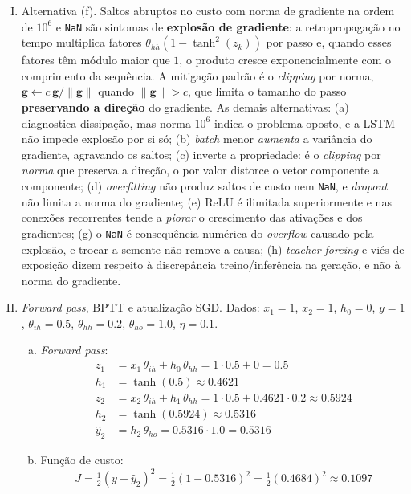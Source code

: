 \documentclass{dlproblemset}
\begin{document}
\begin{enumerate}[I)]
    \item Alternativa (f). Saltos abruptos no custo com norma de gradiente na ordem de $10^{6}$ e \texttt{NaN} são sintomas de \textbf{explosão de gradiente}: a retropropagação no tempo multiplica fatores $\theta_{hh}(1-\tanh^2(z_k))$ por passo e, quando esses fatores têm módulo maior que $1$, o produto cresce exponencialmente com o comprimento da sequência. A mitigação padrão é o \textit{clipping} por norma, $\mathbf{g} \leftarrow c\,\mathbf{g}/\|\mathbf{g}\|$ quando $\|\mathbf{g}\| > c$, que limita o tamanho do passo \textbf{preservando a direção} do gradiente. As demais alternativas: (a) diagnostica dissipação, mas norma $10^{6}$ indica o problema oposto, e a LSTM não impede explosão por si só; (b) \textit{batch} menor \emph{aumenta} a variância do gradiente, agravando os saltos; (c) inverte a propriedade: é o \textit{clipping} por \emph{norma} que preserva a direção, o por valor distorce o vetor componente a componente; (d) \textit{overfitting} não produz saltos de custo nem \texttt{NaN}, e \textit{dropout} não limita a norma do gradiente; (e) ReLU é ilimitada superiormente e nas conexões recorrentes tende a \emph{piorar} o crescimento das ativações e dos gradientes; (g) o \texttt{NaN} é consequência numérica do \textit{overflow} causado pela explosão, e trocar a semente não remove a causa; (h) \textit{teacher forcing} e viés de exposição dizem respeito à discrepância treino/inferência na geração, e não à norma do gradiente.

    \item \textit{Forward pass}, BPTT e atualização SGD. Dados: $x_1 = 1$, $x_2 = 1$, $h_0 = 0$, $y = 1$, $\theta_{ih} = 0.5$, $\theta_{hh} = 0.2$, $\theta_{ho} = 1.0$, $\eta = 0.1$.
    \begin{enumerate}[a)]
        \item \textit{Forward pass}:
        \begin{align*}
            z_1 &= x_1\,\theta_{ih} + h_0\,\theta_{hh} = 1\cdot 0.5 + 0 = 0.5 \\
            h_1 &= \tanh(0.5) \approx 0.4621 \\
            z_2 &= x_2\,\theta_{ih} + h_1\,\theta_{hh} = 1\cdot 0.5 + 0.4621\cdot 0.2 \approx 0.5924 \\
            h_2 &= \tanh(0.5924) \approx 0.5316 \\
            \hat{y}_2 &= h_2\,\theta_{ho} = 0.5316\cdot 1.0 = 0.5316
        \end{align*}

        \item Função de custo:
        \[
        J = \tfrac{1}{2}(y - \hat{y}_2)^2 = \tfrac{1}{2}(1 - 0.5316)^2 = \tfrac{1}{2}(0.4684)^2 \approx 0.1097
        \]


\end{enumerate}
\end{enumerate}
\end{document}
